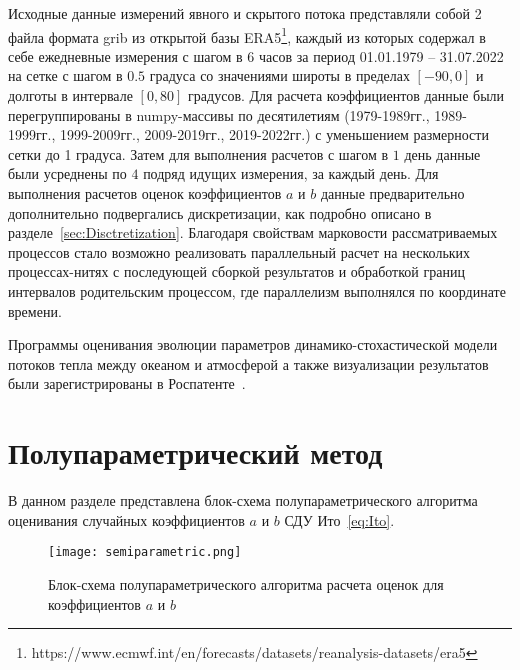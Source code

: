Исходные данные измерений явного и скрытого потока представляли собой 2 файла формата grib из открытой базы ERA5\footnote{https://www.ecmwf.int/en/forecasts/datasets/reanalysis-datasets/era5}, каждый из которых содержал в себе ежедневные измерения с шагом в $6$ часов за период 01.01.1979 -- 31.07.2022 на сетке с шагом в $0.5$ градуса со значениями широты в пределах $[-90, 0]$ и долготы в интервале $[0, 80]$ градусов. Для расчета коэффициентов данные были перегруппированы в numpy-массивы по десятилетиям (1979-1989гг., 1989-1999гг., 1999-2009гг., 2009-2019гг., 2019-2022гг.) с уменьшением размерности сетки до 1 градуса. Затем для выполнения расчетов с шагом в $1$ день данные были усреднены по $4$ подряд идущих измерения, за каждый день. Для выполнения расчетов оценок коэффициентов $a$ и $b$ данные предварительно дополнительно подвергались дискретизации, как подробно описано в разделе~\ref{sec:Disctretization}. Благодаря свойствам марковости рассматриваемых процессов стало возможно реализовать параллельный расчет на нескольких процессах-нитях с последующей сборкой результатов и обработкой границ интервалов родительским процессом, где параллелизм выполнялся по координате времени. 

Программы оценивания эволюции параметров динамико-стохастической модели потоков тепла между океаном и атмосферой а также визуализации результатов были зарегистрированы в Роспатенте~\cite{progbib1, progbib2}.


\section{Полупараметрический метод}
\label{sec:AlgoSemiparametric}
В данном разделе представлена блок-схема полупараметрического алгоритма оценивания случайных коэффициентов $a$ и $b$ СДУ Ито~\eqref{eq:Ito}.
\begin{figure}
	\centering
	\texttt{[image: semiparametric.png]}
	\caption{Блок-схема полупараметрического алгоритма расчета оценок для коэффициентов $a$ и $b$}
	\label{fig:SemiparametricAlgo}
\end{figure}

